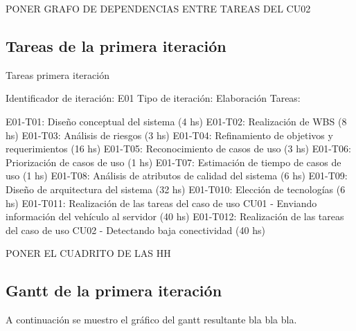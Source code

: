 PONER GRAFO DE DEPENDENCIAS ENTRE TAREAS DEL CU02


\subsection{Tareas de la primera iteración}

Tareas primera iteración

Identificador de iteración: E01
Tipo de iteración: Elaboración
Tareas:

E01-T01: Diseño conceptual del sistema (4 hs)
E01-T02: Realización de WBS (8 hs)
E01-T03: Análisis de riesgos (3 hs)
E01-T04: Refinamiento de objetivos y requerimientos (16 hs)
E01-T05: Reconocimiento de casos de uso (3 hs)
E01-T06: Priorización de casos de uso (1 hs)
E01-T07: Estimación de tiempo de casos de uso (1 hs)
E01-T08: Análisis de atributos de calidad del sistema (6 hs)
E01-T09: Diseño de arquitectura del sistema (32 hs)
E01-T010: Elección de tecnologías (6 hs)
E01-T011: Realización de las tareas del caso de uso CU01 - Enviando información del vehículo al servidor (40 hs)
E01-T012: Realización de las tareas del caso de uso CU02 - Detectando baja conectividad (40 hs)

PONER EL CUADRITO DE LAS HH

\subsection{Gantt de la primera iteración}

A continuación se muestro el gráfico del gantt resultante bla bla bla.

